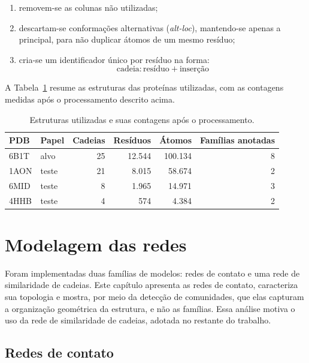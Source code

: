 \documentclass[12pt]{article}
\begin{document}
	\begin{enumerate}
		\item removem-se as colunas não utilizadas;
		\item descartam-se conformações alternativas (\emph{alt-loc}), mantendo-se apenas a principal, para não duplicar átomos de um mesmo resíduo;
		\item cria-se um identificador único por resíduo na forma:
			\[\text{cadeia}:\text{resíduo}+\text{inserção}\]
	\end{enumerate}

	A Tabela~\ref{tab_estruturas} resume as estruturas das proteínas utilizadas, com as contagens medidas após o processamento descrito acima.

	\begin{table}[H]
		\centering
		\caption{Estruturas utilizadas e suas contagens após o processamento.}
		\begin{tabular}{llrrrr}
			\toprule
			\textbf{PDB} & \textbf{Papel} & \textbf{Cadeias} & \textbf{Resíduos} & \textbf{Átomos} & \textbf{Famílias anotadas} \\
			\midrule
			6B1T & alvo  & 25 & 12.544 & 100.134 & 8 \\
			1AON & teste & 21 & 8.015  & 58.674  & 2 \\
			6MID & teste & 8  & 1.965  & 14.971  & 3 \\
			4HHB & teste & 4  & 574    & 4.384   & 2 \\
			\bottomrule
		\end{tabular}
		\label{tab_estruturas}
	\end{table}

	\section{Modelagem das redes}
	\label{sec_modelagem}

	Foram implementadas duas famílias de modelos: redes de contato e uma rede de similaridade de cadeias. Este capítulo apresenta as redes de contato, caracteriza sua topologia e mostra, por meio da detecção de comunidades, que elas capturam a organização geométrica da estrutura, e não as famílias. Essa análise motiva o uso da rede de similaridade de cadeias, adotada no restante do trabalho.

	\subsection{Redes de contato}
	\label{sec_contato}
\end{document}
